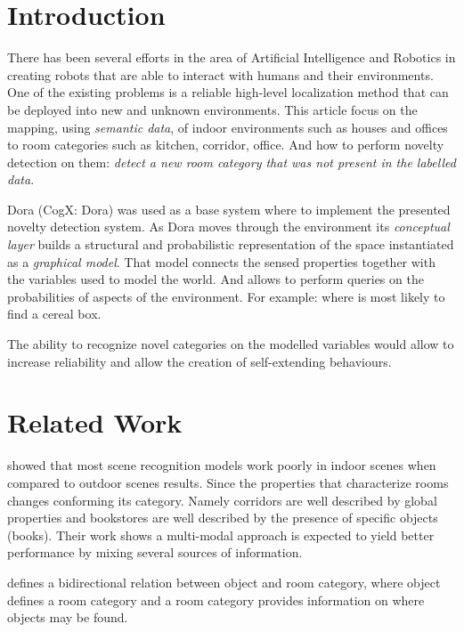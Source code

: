 \documentclass[runningheads,a4paper]{llncs}
\begin{document}
\section{Introduction}
There has been several efforts in the area of Artificial Intelligence and Robotics in creating
robots that are able to interact with humans and their environments.
One of the existing problems is a reliable high-level localization method that can be deployed
into new and unknown environments.
This article focus on the mapping, using \emph{semantic data}, of indoor environments such as
houses and offices to room categories such as kitchen, corridor, office.
And how to perform novelty detection on them: \emph{detect a new room category that was not
present in the labelled data}.

Dora\cite{dora} (CogX: Dora) was used as a base system where to implement the presented novelty
detection system.
As Dora moves through the environment its \emph{conceptual layer} builds a structural and
probabilistic representation of the space instantiated as a \emph{graphical model}.
That model connects the sensed properties together with the variables used to model the world.
And allows to perform queries on the probabilities of aspects of the environment.
For example: where is most likely to find a cereal box\cite{exploiting}.

The ability to recognize novel categories on the modelled variables would allow to increase
reliability and allow the creation of self-extending behaviours.


\section{Related Work}
\cite{quattoni2009recognizing} showed that most scene recognition models work poorly in indoor
scenes when compared to outdoor scenes results.
Since the properties that characterize rooms changes conforming its category. Namely corridors are
well described by global properties and bookstores are well described by the presence of specific objects (books).
Their work shows a multi-modal approach is expected to yield better performance by mixing several sources of information.

\cite{galindo2005multi} defines a bidirectional relation between object and room category, where object defines a room category and a room category provides information on where objects may be found.
\end{document}
